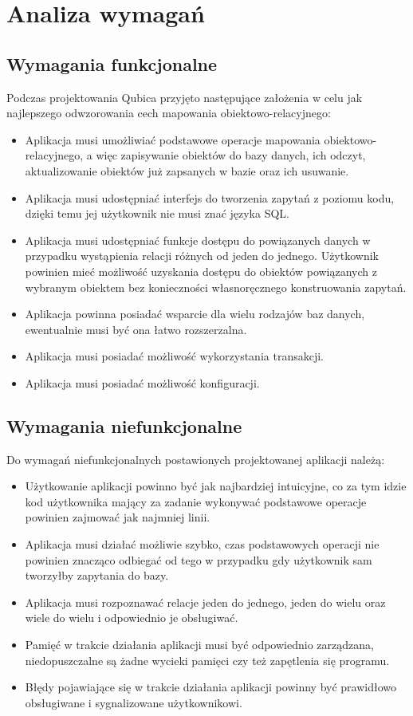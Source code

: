 \documentclass[12pt]{report}
\begin{document}
\section{Analiza wymagań}

\subsection{Wymagania funkcjonalne}

Podczas projektowania Qubica przyjęto następujące założenia w celu jak najlepszego odwzorowania cech mapowania obiektowo-relacyjnego:

\begin{itemize}
\item Aplikacja musi umożliwiać podstawowe operacje mapowania obiektowo-rela\-cyjnego, a więc zapisywanie obiektów do bazy danych, ich odczyt, aktualizowanie obiektów
już zapsanych w bazie oraz ich usuwanie.
\item Aplikacja musi udostępniać interfejs do tworzenia zapytań z poziomu kodu, dzięki temu jej użytkownik nie musi znać języka SQL.
\item Aplikacja musi udostępniać funkcje dostępu do powiązanych danych w przypadku wystąpienia relacji różnych od jeden do jednego. Użytkownik powinien mieć możliwość
uzyskania dostępu do obiektów powiązanych z wybranym obiektem bez konieczności własnoręcznego konstruowania zapytań.
\item Aplikacja powinna posiadać wsparcie dla wielu rodzajów baz danych, ewentualnie musi być ona łatwo rozszerzalna.
\item Aplikacja musi posiadać możliwość wykorzystania transakcji.
\item Aplikacja musi posiadać możliwość konfiguracji.
\end{itemize}

\subsection{Wymagania niefunkcjonalne}

Do wymagań niefunkcjonalnych postawionych projektowanej aplikacji należą:

\begin{itemize}
\item Użytkowanie aplikacji powinno być jak najbardziej intuicyjne, co za tym idzie kod użytkownika mający za zadanie wykonywać podstawowe operacje powinien zajmować
jak najmniej linii.
\item Aplikacja musi działać możliwie szybko, czas podstawowych operacji nie powinien znacząco odbiegać od tego w przypadku gdy użytkownik sam two\-rzyłby zapytania do bazy.
\item Aplikacja musi rozpoznawać relacje jeden do jednego, jeden do wielu oraz wiele do wielu i odpowiednio je obsługiwać.
\item Pamięć w trakcie działania aplikacji musi być odpowiednio zarządzana, niedopuszczalne są żadne wycieki pamięci czy też zapętlenia się programu.
\item Błędy pojawiające się w trakcie działania aplikacji powinny być prawidłowo obsługiwane i sygnalizowane użytkownikowi.
\end{itemize}
\end{document}
